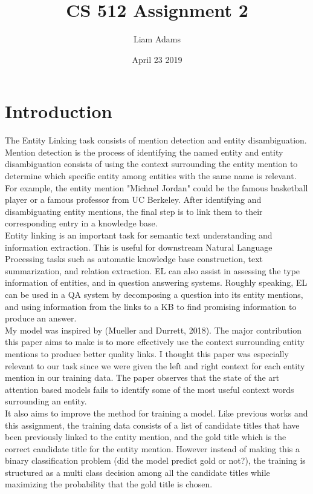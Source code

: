\documentclass{article}
\title{CS 512 Assignment 2}
\author{Liam Adams}
\date{April 23 2019}
\begin{document}
\maketitle

\section{Introduction}
The Entity Linking task consists of mention detection and entity disambiguation.  Mention detection is the process of identifying the named entity and entity disambiguation consists of using the context surrounding the entity mention to determine which specific entity among entities with the same name is relevant.  For example, the entity mention "Michael Jordan" could be the famous basketball player or a famous professor from UC Berkeley.  After identifying and disambiguating entity mentions, the final step is to link them to their corresponding entry in a knowledge base.\\
Entity linking is an important task for semantic text understanding and information extraction.  This is useful for downstream Natural Language Processing tasks such as automatic knowledge base construction, text summarization, and relation extraction.  EL can also assist in assessing the type information of entities, and in question answering systems.  Roughly speaking, EL can be used in a QA system by decomposing a question into its entity mentions, and using information from the links to a KB to find promising information to produce an answer.\\
My model was inspired by (Mueller and Durrett, 2018).  The major contribution this paper aims to make is to more effectively use the context surrounding entity mentions to produce better quality links.  I thought this paper was especially relevant to our task since we were given the left and right context for each entity mention in our training data.  The paper observes that the state of the art attention based models fails to identify some of the most useful context words surrounding an entity.\\
It also aims to improve the method for training a model.  Like previous works and this assignment, the training data consists of a list of candidate titles that have been previously linked to the entity mention, and the gold title which is the correct candidate title for the entity mention.  However instead of making this a binary classification problem (did the model predict gold or not?), the training is structured as a multi class decision among all the candidate titles while maximizing the probability that the gold title is chosen.\\
\end{document}
